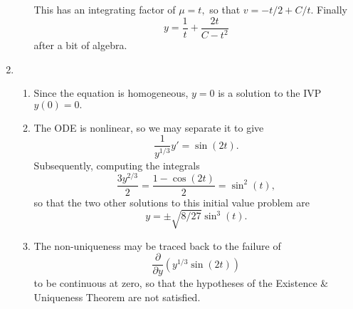 \documentclass[10pt,a4paper]{article}
\begin{document}
\begin{enumerate}
\begin{enumerate}
This has an integrating factor of $\mu = t,$ so that $v = -t/2 + C/t.$ Finally 
\[ y = \frac{1}{t} + \frac{2t}{C-t^2} \]
after a bit of algebra.
\end{enumerate}
\item \begin{enumerate}
\item Since the equation is homogeneous, $y=0$ is a solution to the IVP $y(0) = 0.$
\item The ODE is nonlinear, so we may separate it to give 
\[ \frac{1}{y^{1/3}}y' = \sin(2t). \]
Subsequently, computing the integrals
\[ \frac{3y^{2/3}}{2}=\frac{1-\cos(2t)}{2} = \sin^2(t), \]
so that the two other solutions to this initial value problem are
\[ y = \pm \sqrt{8/27} \sin^3(t). \]
\item The non-uniqueness may be traced back to the failure of 
\[ \frac{\partial}{\partial y}(y^{1/3} \sin(2t)) \] 
to be continuous at zero, so that the hypotheses of the Existence \& Uniqueness Theorem are not satisfied.
\end{enumerate}
\end{enumerate}
\end{document}

